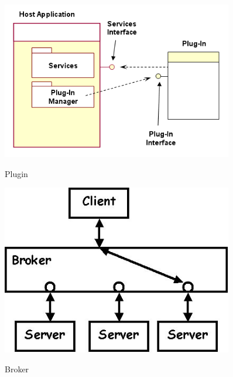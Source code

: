 \begin{figure}[htb]
    \centering
    \begin{minipage}[t]{0.45\linewidth}
		\centering
		\includegraphics[width=0.9\textwidth]{images/plugin}
		\label{fig:plugin}
		\caption{Plugin}
	\end{minipage}%
	\hfill
    \begin{minipage}[t]{0.45\linewidth}
		\centering
		\includegraphics[width=0.9\textwidth]{images/broker}
		\label{fig:broker}
		\caption{Broker}
	\end{minipage}
\end{figure}

